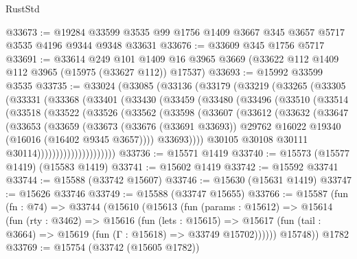 \begin{lexlean}{RustStd}
\begin{coremodule}
@33673 := @19284 @33599 @3535 @99 @1756 @1409 @3667 @345 @3657 @5717 @3535 @4196 @9344 @9348 @33631
@33676 := @33609 @345 @1756 @5717
@33691 := @33614
    @249
    @101
    @1409
    @16
    @3965
    @3669
    (@33622 @112 @1409 @112 @3965 (@15975 (@33627 @112)) @17537)
@33693 := @15992 @33599 @3535
@33735 := @33024
    (@33085
      (@33136
        (@33179
          (@33219
            (@33265
              (@33305
                (@33331
                  (@33368
                    (@33401
                      (@33430
                        (@33459
                          (@33480
                            (@33496
                              (@33510
                                (@33514
                                  (@33518
                                    (@33522
                                      (@33526
                                        (@33562
                                          (@33598
                                            (@33607
                                              (@33612
                                                (@33632
                                                  (@33647
                                                    (@33653
                                                      (@33659
                                                        (@33673
                                                          (@33676 (@33691 @33693))
                                                          @29762
                                                          @16022
                                                          @19340
                                                          (@16016 (@16402 @9345 @3657))))
                                                      @33693))))
                                              @30105
                                              @30108
                                              @30111
                                              @30114)))))))))))))))))))))
@33736 := @15571 @1419
@33740 := @15573 (@15577 @1419) (@15583 @1419)
@33741 := @15602 @1419
@33742 := @15592 @33741
@33744 := @15588 (@33742 @15607)
@33746 := @15630 (@15631 @1419)
@33747 := @15626 @33746
@33749 := @15588 (@33747 @15655)
@33766 := @15587
    (fun (fn : @74) =>
    @33744
      (@15610
        (@15613
          (fun (params : @15612) =>
          @15614
            (fun (rty : @3462) =>
            @15616
              (fun (lets : @15615) =>
              @15617 (fun (tail : @3664) => @15619 (fun (Γ : @15618) => @33749 @15702))))))
        @15748))
    @1782
@33769 := @15754 (@33742 (@15605 @1782))

\end{coremodule}
\end{lexlean}
